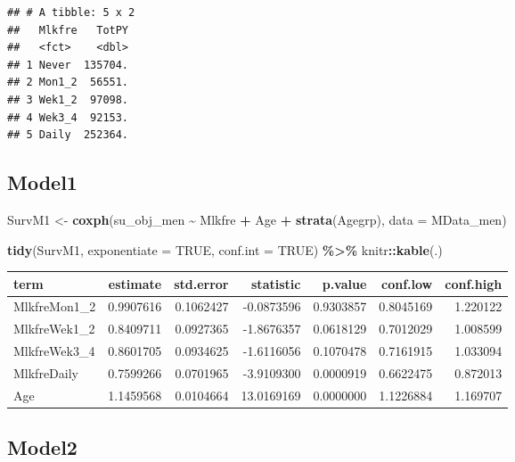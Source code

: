 \documentclass[
]{article}
\newenvironment{Shaded}{\begin{snugshade}}{\end{snugshade}}
\newcommand{\DataTypeTok}[1]{\textcolor[rgb]{0.13,0.29,0.53}{#1}}
\newcommand{\KeywordTok}[1]{\textcolor[rgb]{0.13,0.29,0.53}{\textbf{#1}}}
\newcommand{\NormalTok}[1]{#1}
\newcommand{\OperatorTok}[1]{\textcolor[rgb]{0.81,0.36,0.00}{\textbf{#1}}}
\newcommand{\OtherTok}[1]{\textcolor[rgb]{0.56,0.35,0.01}{#1}}
\newcommand{\StringTok}[1]{\textcolor[rgb]{0.31,0.60,0.02}{#1}}
\begin{document}
\begin{verbatim}
## # A tibble: 5 x 2
##   Mlkfre   TotPY
##   <fct>    <dbl>
## 1 Never  135704.
## 2 Mon1_2  56551.
## 3 Wek1_2  97098.
## 4 Wek3_4  92153.
## 5 Daily  252364.
\end{verbatim}

\hypertarget{model1-1}{%
\subsection{Model1}\label{model1-1}}

\begin{Shaded}
\begin{Highlighting}[]
\NormalTok{SurvM1 \textless{}{-}}\StringTok{  }\KeywordTok{coxph}\NormalTok{(su\_obj\_men }\OperatorTok{\textasciitilde{}}\StringTok{ }\NormalTok{Mlkfre }\OperatorTok{+}\StringTok{ }\NormalTok{Age }\OperatorTok{+}\StringTok{ }\KeywordTok{strata}\NormalTok{(Agegrp), }
                 \DataTypeTok{data =}\NormalTok{ MData\_men)}

\KeywordTok{tidy}\NormalTok{(SurvM1, }\DataTypeTok{exponentiate =} \OtherTok{TRUE}\NormalTok{, }\DataTypeTok{conf.int =} \OtherTok{TRUE}\NormalTok{) }\OperatorTok{\%\textgreater{}\%}\StringTok{ }
\StringTok{  }\NormalTok{knitr}\OperatorTok{::}\KeywordTok{kable}\NormalTok{(.)}
\end{Highlighting}
\end{Shaded}

\begin{longtable}[]{@{}lrrrrrr@{}}
\toprule
term & estimate & std.error & statistic & p.value & conf.low &
conf.high\tabularnewline
\midrule
\endhead
MlkfreMon1\_2 & 0.9907616 & 0.1062427 & -0.0873596 & 0.9303857 &
0.8045169 & 1.220122\tabularnewline
MlkfreWek1\_2 & 0.8409711 & 0.0927365 & -1.8676357 & 0.0618129 &
0.7012029 & 1.008599\tabularnewline
MlkfreWek3\_4 & 0.8601705 & 0.0934625 & -1.6116056 & 0.1070478 &
0.7161915 & 1.033094\tabularnewline
MlkfreDaily & 0.7599266 & 0.0701965 & -3.9109300 & 0.0000919 & 0.6622475
& 0.872013\tabularnewline
Age & 1.1459568 & 0.0104664 & 13.0169169 & 0.0000000 & 1.1226884 &
1.169707\tabularnewline
\bottomrule
\end{longtable}

\hypertarget{model2-1}{%
\subsection{Model2}\label{model2-1}}
\end{document}
